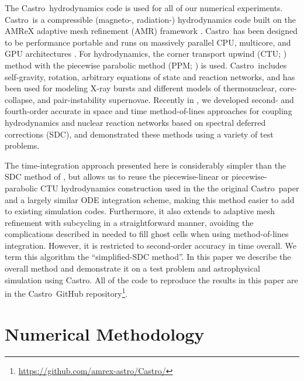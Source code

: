 \documentclass[linenumbers]{aastex631}
\newcommand{\castro}{{\sf Castro}}
\newcommand{\MarginPar}[1]{\marginpar{\vskip-\baselineskip\raggedright\tiny\sffamily\hrule\smallskip{\color{red}#1}\par\smallskip\hrule}}
\begin{document}
The \castro\ hydrodynamics code \citep{castro,castro_joss} is used for
all of our numerical experiments.  \castro\ is a compressible
(magneto-, radiation-) hydrodynamics code built on the AMReX adaptive
mesh refinement (AMR) framework \citep{amrex_joss}.  \castro\ has been
designed to be performance portable and runs on massively parallel CPU,
multicore, and GPU architectures \citep{castro_gpu}.  For hydrodynamics, the
corner transport upwind (CTU; \citealt{ppmunsplit}) method with the
piecewise parabolic method (PPM; \citealt{ppm,millercolella:2002}) is
used.  \castro\ includes self-gravity, rotation, arbitrary equations
of state and reaction networks, and has been used for modeling X-ray
bursts and different models of thermonuclear, core-collapse, and
pair-instability supernovae.  Recently in \citet{castro_sdc}, we
developed second- and fourth-order accurate in space and time
method-of-lines approaches for coupling hydrodynamics and nuclear reaction networks based on
spectral deferred corrections (SDC), and demonstrated these
methods using a variety of test problems.

The time-integration approach presented here is considerably simpler
than the SDC method of \citet{castro_sdc}, but allows us to reuse the
piecewise-linear or piecewise-parabolic CTU hydrodynamics
construction \citep{saltzman1994,millercolella:2002}
used in the the original \castro\ paper
and a largely similar ODE integration scheme, making this
method easier to add to existing simulation codes.  Furthermore, it
also extends to adaptive mesh refinement with subcycling in a
straightforward manner, avoiding the complications described in
\cite{mccorquodalecolella} needed to fill ghost cells when using
method-of-lines integration.  However, it is restricted to
second-order accuracy in time overall.  We term this algorithm the
``simplified-SDC method''.  In this paper we describe the overall
method and demonstrate it on a test problem and astrophysical
simulation using \castro.  All of the code to reproduce the results in
this paper are in the \castro\ GitHub
repository\footnote{\url{https://github.com/amrex-astro/Castro/}}.

\section{Numerical Methodology}
\end{document}
